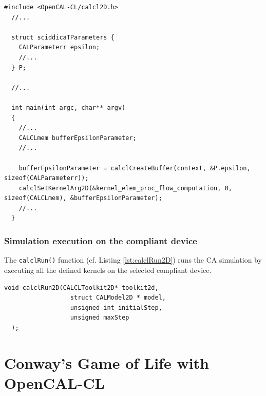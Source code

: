 \begin{lstlisting}[float,floatplacement=H, label=lst:calclKernelParameters, caption=Passing parametrs to kernel.]
  #include <OpenCAL-CL/calcl2D.h>
  //...
  
  struct sciddicaTParameters {
    CALParameterr epsilon;
    //...
  } P;

  //...
  
  int main(int argc, char** argv)
  {
    //...
    CALCLmem bufferEpsilonParameter;
    //...

    bufferEpsilonParameter = calclCreateBuffer(context, &P.epsilon, sizeof(CALParameterr));
    calclSetKernelArg2D(&kernel_elem_proc_flow_computation, 0, sizeof(CALCLmem), &bufferEpsilonParameter);    
    //...
  }
\end{lstlisting}


\subsubsection{Simulation execution on the compliant device}

The \verb'calclRun()' function (cf. Listing \ref{lst:calclRun2D}) runs the CA simulation by executing
all the defined kernels on the selected compliant device.

\begin{lstlisting}[float,floatplacement=H, label=lst:calclRun2D, caption=The calclRun2D function., numbers=none]
  void calclRun2D(CALCLToolkit2D* toolkit2d,
                  struct CALModel2D * model,
                  unsigned int initialStep,
                  unsigned maxStep
  );
\end{lstlisting}


\section{Conway's Game of Life with OpenCAL-CL}
 
